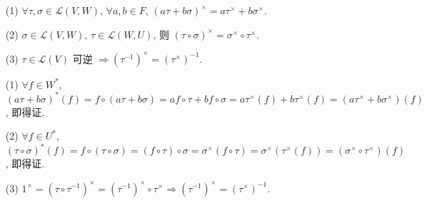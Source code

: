 \documentclass{note}
\begin{document}
\begin{thm}[(课本定理 3.18)]
    \begin{itemize}
        \item[(1)] $\forall\tau,\sigma\in\mathcal{L}(V,W)$, $\forall a,b\in F$, $(a\tau+b\sigma)^{\times}=a\tau^{\times}+b\sigma^{\times}$.
        \item[(2)] $\sigma\in\mathcal{L}(V,W)$, $\tau\in\mathcal{L}(W,U)$, 则 $(\tau\circ\sigma)^{\times}=\sigma^{\times}\circ\tau^{\times}$.
        \item[(3)] $\mathcal{\tau}\in\mathcal{L}(V)$ 可逆 $\Longrightarrow(\tau^{-1})^{\times}=(\tau^{\times})^{-1}$.
    \end{itemize}
\end{thm}
\begin{pf}
    \begin{itemize}
        \item[(1)] $\forall f\in W^*$, $(a\tau+b\sigma)^*(f)=f\circ(a\tau+b\sigma)=af\circ\tau+bf\circ\sigma=a\tau^{\times}(f)+b\tau^{\times}(f)=(a\tau^{\times}+b\sigma^{\times})(f)$, 即得证.
        \item[(2)] $\forall f\in U^*$, $(\tau\circ\sigma)^*(f)=f\circ(\tau\circ\sigma)=(f\circ\tau)\circ\sigma=\sigma^{\times}(f\circ\tau)=\sigma^{\times}(\tau^{\times}(f))=(\sigma^{\times}\circ\tau^{\times})(f)$, 即得证.
        \begin{center}
        \end{center}
        \item[(3)] $1^{\times}=(\tau\circ\tau^{-1})^{\times}=(\tau^{-1})^{\times}\circ\tau^{\times}\Longrightarrow(\tau^{-1})^{\times}=(\tau^{\times})^{-1}$.
    \end{itemize}
\end{pf}
\end{document}
